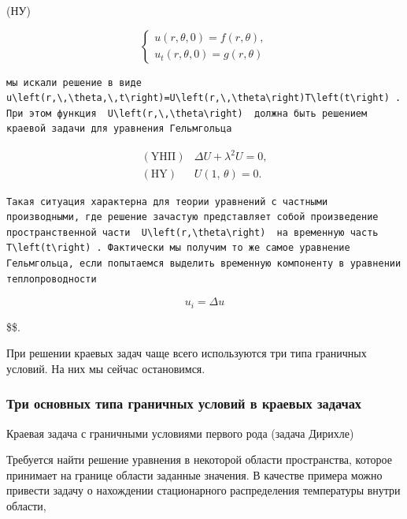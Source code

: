 \documentclass[
  ukrainian,
]{article}
\begin{document}
(НУ)

\[
\begin{cases} u(r, \theta, 0) = f(r, \theta), \\ u_t(r, \theta, 0) = g(r, \theta) \end{cases}
\]

\begin{verbatim}
мы искали решение в виде  u\left(r,\,\theta,\,t\right)=U\left(r,\,\theta\right)T\left(t\right) . При этом функция  U\left(r,\,\theta\right)  должна быть решением краевой задачи для уравнения Гельмгольца
\end{verbatim}

\[
\begin{array}{ll} (\mathrm{Y}\mathrm{H}\mathrm{\Pi}) & \Delta U + \lambda^2 U = 0, \\ (\mathrm{H}\mathrm{Y}) & U\left(1,\,\theta\right) = 0. \end{array}
\]

\begin{verbatim}
Такая ситуация характерна для теории уравнений с частными производными, где решение зачастую представляет собой произведение пространственной части  U\left(r,\theta\right)  на временную часть  T\left(t\right) . Фактически мы получим то же самое уравнение Гельмгольца, если попытаемся выделить временную компоненту в уравнении теплопроводности
\end{verbatim}

\[
u_i = \Delta u
\]

\$\$.

При решении краевых задач чаще всего используются три типа граничных
условий. На них мы сейчас остановимся.

\subsubsection{Три основных типа граничных условий в краевых
задачах}\label{ux442ux440ux438-ux43eux441ux43dux43eux432ux43dux44bux445-ux442ux438ux43fux430-ux433ux440ux430ux43dux438ux447ux43dux44bux445-ux443ux441ux43bux43eux432ux438ux439-ux432-ux43aux440ux430ux435ux432ux44bux445-ux437ux430ux434ux430ux447ux430ux445}

Краевая задача с граничными условиями первого рода (задача Дирихле)

Требуется найти решение уравнения в некоторой области пространства,
которое принимает на границе области заданные значения. В качестве
примера можно привести задачу о нахождении стационарного распределения
температуры внутри области,
\end{document}
